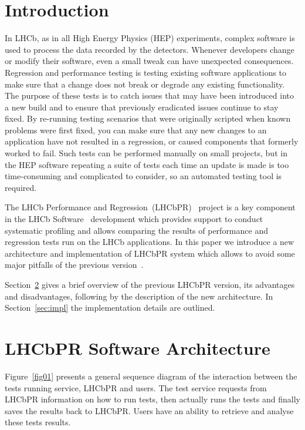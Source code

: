 \documentclass[a4paper]{jpconf}
\begin{document}
\section{Introduction}

In LHCb, as in all High Energy Physics (HEP) experiments, complex software is
used to process the data recorded by the detectors. Whenever developers change
or modify their software, even a small tweak can have unexpected
consequences. Regression and performance testing is testing existing software
applications to make sure that a change does not break or degrade any existing
functionality. The purpose of these tests is to catch issues that may have been
introduced into a new build and to ensure that previously eradicated issues
continue to stay fixed. By re-running testing scenarios that were originally
scripted when known problems were first fixed, you can make sure that any new
changes to an application have not resulted in a regression, or caused components
that formerly worked to fail. Such tests can be performed manually on small
projects, but in the HEP software repeating a suite of tests each time an update
is made is too time-consuming and complicated to consider, so an automated
testing tool is required. 

The LHCb Performance and Regression~(LHCbPR)~\cite{lhcbpr}  project is a key
component in the LHCb Software~\cite{lhcbsoft} development which provides
support to conduct systematic profiling and allows comparing the results of
performance and regression tests run on the LHCb applications. In this paper we
introduce a new architecture and implementation of LHCbPR system which allows to
avoid some major pitfalls of the previous version~\cite{lhcbpr}.

Section~\ref{sec:arch} gives a brief overview of the previous LHCbPR version,
its advantages and disadvantages, following by the description of the
new architecture. In Section~\ref{sec:impl} the implementation details are outlined.


\section{LHCbPR Software Architecture}\label{sec:arch}

Figure~\ref{fig01} presents a general sequence diagram of the interaction between
the tests running service, LHCbPR  and users. The test service requests from
LHCbPR information on how to run tests, then actually runs the tests and finally
saves the results back to LHCbPR. Users have an ability to retrieve and analyse
these tests results.
\end{document}
